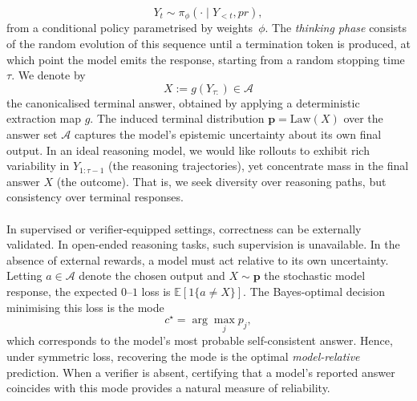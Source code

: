 \documentclass{article} %
\begin{document}
\[
Y_t \sim \pi_\phi(\cdot \mid Y_{<t}, pr),
\]
from a conditional policy parametrised by weights~$\phi$. 
The \emph{thinking phase} consists of the random evolution of this sequence until a termination token is produced, at which point the model emits the response, starting from a random stopping time~$\tau$. 
We denote by
\[
X := g(Y_{\tau:}) \in \mathcal{A}
\]
the canonicalised terminal answer, obtained by applying a deterministic extraction map $g$. 
The induced terminal distribution $\mathbf p = \mathrm{Law}(X)$ over the answer set $\mathcal{A}$ captures the model’s epistemic uncertainty about its own final output. 
In an ideal reasoning model, we would like rollouts to exhibit rich variability in $Y_{1:\tau-1}$ (the reasoning trajectories), yet concentrate mass in the final answer $X$ (the outcome). That is, we seek {diversity over reasoning paths, but consistency over terminal responses}.
\\\\
In supervised or verifier-equipped settings, correctness can be externally validated. 
In open-ended reasoning tasks, such supervision is unavailable. 
In the absence of external rewards, a model must act relative to its own uncertainty. 
Letting $a \in \mathcal{A}$ denote the chosen output and $X \sim \mathbf p$ the stochastic model response, the expected $0$--$1$ loss is $\mathbb{E}[1\{a \neq X\}]$. 
The Bayes-optimal decision minimising this loss is the mode
\[
c^\star = \arg\max_j p_j,
\]
which corresponds to the model’s most probable self-consistent answer. 
Hence, under symmetric loss, recovering the mode is the optimal \emph{model-relative} prediction. 
When a verifier is absent, certifying that a model’s reported answer coincides with this mode provides a natural measure of reliability.
\end{document}
